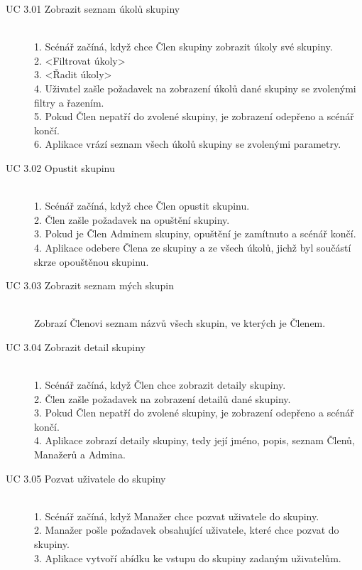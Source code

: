\documentclass[thesis=B,czech]{FITthesis}[2012/06/26]
\begin{document}
			\begin{description}
				\item[UC 3.01 Zobrazit seznam úkolů skupiny] \hfill \\
					1. Scénář začíná, když chce Člen skupiny zobrazit úkoly své skupiny. \\
					2. <Filtrovat úkoly> \\
					3. <Řadit úkoly> \\
					4. Uživatel zašle požadavek na zobrazení úkolů dané skupiny se zvolenými filtry a řazením. \\
					5. Pokud Člen nepatří do zvolené skupiny, je zobrazení odepřeno a scénář končí. \\
					6. Aplikace vrází seznam všech úkolů skupiny se zvolenými parametry. \\
					
				\item[UC 3.02 Opustit skupinu] \hfill \\
					1. Scénář začíná, když chce Člen opustit skupinu. \\
					2. Člen zašle požadavek na opuštění skupiny. \\
					3. Pokud je Člen Adminem skupiny, opuštění je zamítnuto a scénář končí. \\
					4. Aplikace odebere Člena ze skupiny a ze všech úkolů, jichž byl součástí skrze opouštěnou skupinu.
				
				\item[UC 3.03 Zobrazit seznam mých skupin] \hfill \\
					Zobrazí Členovi seznam názvů všech skupin, ve kterých je Členem.
				
				\item[UC 3.04 Zobrazit detail skupiny] \hfill \\
					1. Scénář začíná, když Člen chce zobrazit detaily skupiny. \\
					2. Člen zašle požadavek na zobrazení detailů dané skupiny. \\
					3. Pokud Člen nepatří do zvolené skupiny, je zobrazení odepřeno a scénář končí. \\
					4. Aplikace zobrazí detaily skupiny, tedy její jméno, popis, seznam Členů, Manažerů a Admina.
				
				\item[UC 3.05 Pozvat uživatele do skupiny] \hfill \\
					1. Scénář začíná, když Manažer chce pozvat uživatele do skupiny. \\
					2. Manažer pošle požadavek obsahující uživatele, které chce pozvat do skupiny. \\
					3. Aplikace vytvoří abídku ke vstupu do skupiny zadaným uživatelům. \\
				

\end{description}
\end{document}
